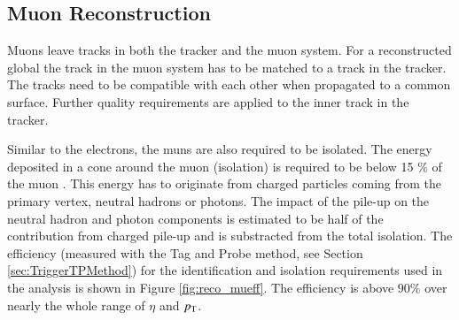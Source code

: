 \subsection{Muon Reconstruction}

Muons leave tracks in both the tracker and the muon system. For a reconstructed global the track in the muon system has to be matched to a track in the tracker.
The tracks need to be compatible with each other when propagated to a common surface.
Further quality requirements are applied to the inner track in the tracker.

Similar to the electrons, the muns are also required to be isolated. The energy deposited in a cone around the muon (isolation) is required to be below 15 \% of the muon \pt.
This energy has to originate from charged particles coming from the primary vertex, neutral hadrons or photons. The impact of the pile-up on the neutral hadron and photon components
is estimated to be half of the contribution from charged pile-up and is substracted from the total isolation.
The efficiency (measured with the Tag and Probe method, see Section \ref{sec:TriggerTPMethod}) for the identification and isolation requirements used in the analysis is shown in Figure \ref{fig:reco_mueff}.
The efficiency is above $90\%$ over nearly the whole range of $\eta$ and $p_{\mathrm{T}}$.


